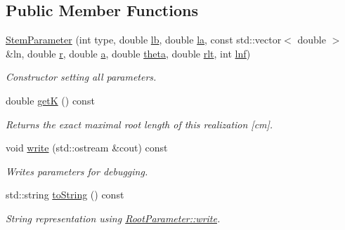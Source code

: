 \subsection*{Public Member Functions}
\begin{DoxyCompactItemize}
\item 
\mbox{\label{classCPlantBox_1_1StemParameter_accc72251a1c17e2b2767e0fc102bc9ac}} 
\hyperlink{classCPlantBox_1_1StemParameter_accc72251a1c17e2b2767e0fc102bc9ac}{Stem\+Parameter} (int type, double \hyperlink{classCPlantBox_1_1StemParameter_a2499c404667303a41e4f89a3676b427f}{lb}, double \hyperlink{classCPlantBox_1_1StemParameter_ad54976c5780ae15fa90f9cb5548259e5}{la}, const std\+::vector$<$ double $>$ \&ln, double \hyperlink{classCPlantBox_1_1StemParameter_ac7b0ac997234f9d19251ad61b7c62143}{r}, double \hyperlink{classCPlantBox_1_1StemParameter_a8bb3c1cc168ad3fbbd377fa5673aba8a}{a}, double \hyperlink{classCPlantBox_1_1StemParameter_a243c0e56ca8e9939dd4c8a2a24fd5901}{theta}, double \hyperlink{classCPlantBox_1_1StemParameter_a2a39b06bbe7eef3e295017e2ec2240c6}{rlt}, int \hyperlink{classCPlantBox_1_1StemParameter_ac695d4e1ec87a78b07aa699a335a3632}{lnf})
\begin{DoxyCompactList}\small\item\em Constructor setting all parameters. \end{DoxyCompactList}\item 
\mbox{\label{classCPlantBox_1_1StemParameter_ad7f0906ad2d1d33b98cf23fc0e7f86f0}} 
double \hyperlink{classCPlantBox_1_1StemParameter_ad7f0906ad2d1d33b98cf23fc0e7f86f0}{getK} () const
\begin{DoxyCompactList}\small\item\em Returns the exact maximal root length of this realization \mbox{[}cm\mbox{]}. \end{DoxyCompactList}\item 
\mbox{\label{classCPlantBox_1_1StemParameter_a76df300d1a2a2245bf9584412d6b1051}} 
void \hyperlink{classCPlantBox_1_1StemParameter_a76df300d1a2a2245bf9584412d6b1051}{write} (std\+::ostream \&cout) const
\begin{DoxyCompactList}\small\item\em Writes parameters for debugging. \end{DoxyCompactList}\item 
\mbox{\label{classCPlantBox_1_1StemParameter_a956ad444e0f7611253de2b32aeae9f34}} 
std\+::string \hyperlink{classCPlantBox_1_1StemParameter_a956ad444e0f7611253de2b32aeae9f34}{to\+String} () const
\begin{DoxyCompactList}\small\item\em String representation using \hyperlink{classCPlantBox_1_1RootParameter_aed958341f67d2bb36e1480e531732535}{Root\+Parameter\+::write}. \end{DoxyCompactList}\end{DoxyCompactItemize}

